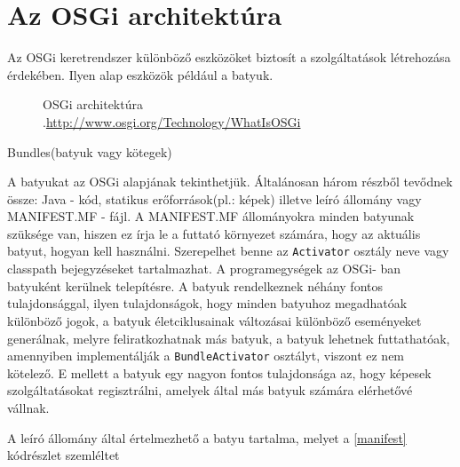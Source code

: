 \section{Az OSGi architektúra}\label{sec:OSGI_architektura}

Az OSGi keretrendszer különböző eszközöket biztosít a szolgáltatások létrehozása érdekében. Ilyen alap eszközök például a batyuk\cite{batyu}.

\begin{figure}[t]
  \centering
  \caption[OSGi architektura]%
  {OSGi architektúra\\
  {\white .}\hfill\url{http://www.osgi.org/Technology/WhatIsOSGi}}
  \label{fig:osgiArchitektura}
\end{figure}

Bundles(batyuk vagy kötegek)

A batyukat az OSGi alapjának tekinthetjük. Általánosan három részből tevődnek össze: Java - kód, statikus erőforrások(pl.: képek) illetve leíró állomány vagy MANIFEST.MF - fájl. A MANIFEST.MF állományokra minden batyunak szüksége van, hiszen ez írja le a futtató környezet számára, hogy az aktuális batyut, hogyan kell használni. Szerepelhet benne az \texttt{Activator} osztály neve vagy classpath bejegyzéseket tartalmazhat. A programegységek az OSGi- ban batyuként kerülnek telepítésre. A batyuk rendelkeznek néhány fontos tulajdonsággal, ilyen tulajdonságok, hogy minden batyuhoz megadhatóak különböző jogok, a batyuk életciklusainak változásai különböző eseményeket generálnak, melyre feliratkozhatnak más batyuk, a batyuk lehetnek futtathatóak, amennyiben implementálják a \texttt{BundleActivator} osztályt, viszont ez nem kötelező. E mellett a batyuk egy nagyon fontos tulajdonsága az, hogy képesek szolgáltatásokat regisztrálni, amelyek által más batyuk számára elérhetővé vállnak.

A leíró állomány által értelmezhető a batyu tartalma, melyet a \ref{manifest} kódrészlet szemléltet
% 
\lstset{
  numbers=left,
  stepnumber=1,    
  firstnumber=1,
  numberfirstline=true
}

 

